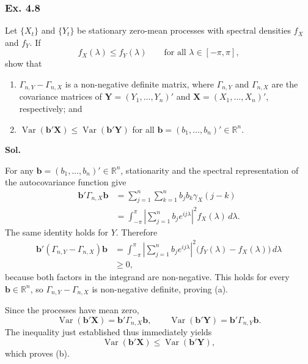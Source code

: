 \documentclass[lang=en,11pt,a4paper,citestyle =authoryear]{elegantpaper}
\begin{document}
\subsubsection*{Ex. 4.8}
Let $\{X_t\}$ and $\{Y_t\}$ be stationary zero-mean processes with spectral
densities $f_X$ and $f_Y$. If
\[
f_X(\lambda)\leq f_Y(\lambda)
\qquad\text{for all }\lambda\in[-\pi,\pi],
\]
show that
\begin{enumerate}[label=(\alph*),leftmargin=*]
    \item $\Gamma_{n,Y}-\Gamma_{n,X}$ is a non-negative definite matrix,
    where $\Gamma_{n,Y}$ and $\Gamma_{n,X}$ are the covariance matrices of
    $\mathbf Y=(Y_1,\ldots,Y_n)'$ and
    $\mathbf X=(X_1,\ldots,X_n)'$, respectively; and
    \item $\operatorname{Var}(\mathbf b'\mathbf X)
    \leq\operatorname{Var}(\mathbf b'\mathbf Y)$ for all
    $\mathbf b=(b_1,\ldots,b_n)'\in\mathbb R^n$.
\end{enumerate}
\par\vspace{0.5em}
\textbf{Sol.}\par
For any $\mathbf b=(b_1,\ldots,b_n)'\in\mathbb R^n$, stationarity and the
spectral representation of the autocovariance function give
\begin{align*}
\mathbf b'\Gamma_{n,X}\mathbf b
&=\sum_{j=1}^n\sum_{k=1}^n b_jb_k\gamma_X(j-k)\\
&=\int_{-\pi}^{\pi}
  \left|\sum_{j=1}^n b_je^{ij\lambda}\right|^2
  f_X(\lambda)\,d\lambda.
\end{align*}
The same identity holds for $Y$. Therefore
\begin{align*}
\mathbf b'(\Gamma_{n,Y}-\Gamma_{n,X})\mathbf b
&=\int_{-\pi}^{\pi}
  \left|\sum_{j=1}^n b_je^{ij\lambda}\right|^2
  \bigl(f_Y(\lambda)-f_X(\lambda)\bigr)\,d\lambda\\
&\geq 0,
\end{align*}
because both factors in the integrand are non-negative. This holds for every
$\mathbf b\in\mathbb R^n$, so
$\Gamma_{n,Y}-\Gamma_{n,X}$ is non-negative definite, proving (a).

Since the processes have mean zero,
\[
\operatorname{Var}(\mathbf b'\mathbf X)
=\mathbf b'\Gamma_{n,X}\mathbf b,
\qquad
\operatorname{Var}(\mathbf b'\mathbf Y)
=\mathbf b'\Gamma_{n,Y}\mathbf b.
\]
The inequality just established thus immediately yields
\[
\operatorname{Var}(\mathbf b'\mathbf X)
\leq \operatorname{Var}(\mathbf b'\mathbf Y),
\]
which proves (b).
\vspace{1em}
\end{document}
